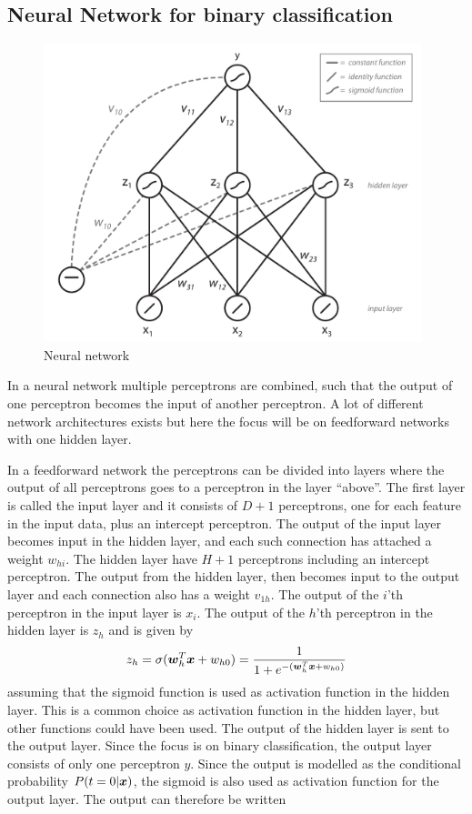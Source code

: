 \subsection{Neural Network for binary classification}
\begin{figure}[ht]
    \centering
    \includegraphics[width=110mm]{media/neural-network.pdf}
    \caption{Neural network}
    \label{fig:neural-network}
\end{figure}
In a neural network multiple perceptrons are combined, such that the output of one perceptron becomes the input of another perceptron. A lot of different network architectures exists but here the focus will be on feedforward networks with one hidden layer. \par
In a feedforward network the perceptrons can be divided into layers where the output of all perceptrons goes to a perceptron in the layer ``above''. The first layer is called the input layer and it consists of $D+1$ perceptrons, one for each feature in the input data, plus an intercept perceptron. The output of the input layer becomes input in the hidden layer, and each such connection has attached a weight $w_{hi}$. The hidden layer have $H+1$ perceptrons including an intercept perceptron. The output from the hidden layer, then becomes input to the output layer and each connection also has a weight $v_{1h}$. The output of the $i$'th perceptron in the input layer is $x_i$. The output of the $h$'th perceptron in the hidden layer is $z_h$ and is given by
\[
z_h = \sigma(\boldsymbol{w}_h^T\boldsymbol{x}+w_{h0}) = \frac{1}{1+e^{-(\boldsymbol{w}_h^T\boldsymbol{x}+w_{h0})}}
\]
assuming that the sigmoid function is used as activation function in the hidden layer. This is a common choice as activation function in the hidden layer, but other functions could have been used. The output of the hidden layer is sent to the output layer. Since the focus is on binary classification, the output layer consists of only one perceptron $y$. Since the output is modelled as the conditional probability $P(t=0|\boldsymbol{x})$, the sigmoid is also used as activation function for the output layer. The output can therefore be written
